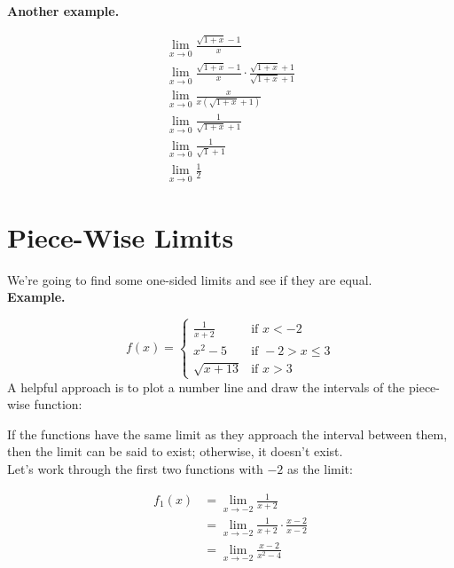 \documentclass{article}
\begin{document}
\textbf{Another example.}

\begin{align*}
    \lim_{x \to 0} \frac{\sqrt{1 + x} - 1}{x}\\
    \lim_{x\to 0} \frac{\sqrt{1+x} - 1}{x} \cdot \frac{\sqrt{1+x} + 1}{\sqrt{1+x} + 1}\\
    \lim_{x\to 0} \frac{x}{x(\sqrt{1+x} + 1)}\\
    \lim_{x \to 0} \frac{1}{\sqrt{1 + x} + 1}\\
    \lim_{x\to 0} \frac{1}{\sqrt{1} + 1}\\
    \lim_{x\to 0} \frac{1}{2}
\end{align*}

\section{Piece-Wise Limits}

We're going to find some one-sided limits and see if they are equal. \\

\textbf{Example.}

$$
f(x) = \begin{cases}
    \frac{1}{x+2} & \text{if } x < -2\\
    x^2 - 5 & \text{if } -2 > x \leq 3\\
    \sqrt{x+13} & \text{if } x > 3
\end{cases}
$$
A helpful approach is to plot a number line and draw the intervals of the piece-wise
function:\\


If the functions have the same limit as they approach the interval between them, then the
limit can be said to exist; otherwise, it doesn't exist.\\

Let's work through the first two functions with $-2$ as the limit:

\begin{align*}
    f_1(x) &= \lim_{x \to -2} \frac{1}{x + 2}\\
           &= \lim_{x\to -2} \frac{1}{x+2} \cdot \frac{x-2}{x-2}\\
           &= \lim_{x\to -2} \frac{x-2}{x^2-4}
\end{align*}
\end{document}
